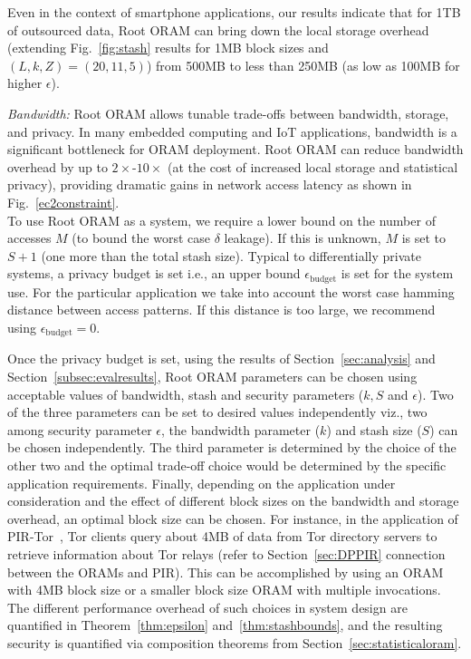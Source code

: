 \documentclass[USenglish,oneside,twocolumn]{article}
\makeatletter
\newcommand{\ourprotocol}{Root ORAM}
\let\origsubsection\subsection
\renewcommand\subsection{\@ifstar{\starsubsection}{\nostarsubsection}}
\newcommand\nostarsubsection[1]
{\subsectionprelude\origsubsection{#1}\subsectionpostlude}
\newcommand\starsubsection[1]
{\subsectionprelude\origsubsection*{#1}\subsectionpostlude}
\newcommand\subsectionprelude{\vspace{-1.5em}}
\newcommand\subsectionpostlude{\vspace{-1em}}
\makeatother
\begin{document}
Even in the context of smartphone applications, our results indicate that for 1TB of outsourced data, Root ORAM can bring down the local storage overhead (extending Fig.~\ref{fig:stash} results for 1MB block sizes and $(L, k, Z) = (20,11,5)$) from 500MB to less than  250MB (as low as 100MB for higher $\epsilon$).

\emph{Bandwidth:} \ourprotocol{} allows tunable trade-offs between bandwidth, storage, and privacy. In many embedded computing and IoT applications, bandwidth is a significant bottleneck for ORAM deployment. \ourprotocol{} can reduce bandwidth overhead by up to $2\times$-$10\times$ (at the cost of increased local storage and statistical privacy), providing dramatic gains in network access latency as shown in Fig.~\ref{ec2constraint}.\\

\vspace{-2em}
\subsection{Choosing parameters}\label{subsec:choose}
To use \ourprotocol{} as a system, we require a lower bound on the number of accesses $M$ (to bound the worst case $\delta$ leakage). If this is unknown, $M$ is set to $S+1$ (one more than the total stash size). Typical to differentially private systems, a privacy budget is set i.e., an upper bound $\epsilon_{\text{budget}}$ is set for the system use. For the particular application we take into account the worst case hamming distance between access patterns. If this distance is too large, we recommend using $\epsilon_{\text{budget}} = 0$.

Once the privacy budget is set, using the results of Section~\ref{sec:analysis} and Section~\ref{subsec:evalresults}, \ourprotocol{} parameters can be chosen using acceptable values of bandwidth, stash and security parameters ($k , S$ and $\epsilon$). Two of the three parameters can be set to desired values independently viz., two among security parameter $\epsilon$, the bandwidth parameter ($k$) and stash size ($S$) can be chosen independently. The third parameter is determined by the choice of the other two and the optimal trade-off choice would be determined by the specific application requirements. Finally, depending on the application under consideration and the effect of different block sizes on the bandwidth and storage overhead, an optimal block size can be chosen.
For instance, in the application of PIR-Tor~\cite{pirtor}, Tor clients query about 4MB of data from Tor directory servers to retrieve information about Tor relays (refer to Section~\ref{sec:DPPIR} connection between the ORAMs and PIR). 
This can be accomplished by using an ORAM with 4MB block size or a smaller block size ORAM with multiple invocations. The different performance overhead of such choices in system design are quantified in Theorem~\ref{thm:epsilon} and~\ref{thm:stashbounds}, and the resulting security is quantified via composition theorems from Section~\ref{sec:statisticaloram}. 
\end{document}
